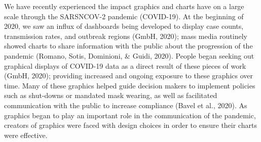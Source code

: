 \documentclass[print]{nuthesis}
\begin{document}
We have recently experienced the impact graphics and charts have on a large scale through the SARSNCOV-2 pandemic (COVID-19). At the beginning of 2020, we saw an influx of dashboards being developed to display case counts, transmission rates, and outbreak regions (GmbH, 2020); mass media routinely showed charts to share information with the public about the progression of the pandemic (Romano, Sotis, Dominioni, \& Guidi, 2020).
People began seeking out graphical displays of COVID-19 data as a direct result of these pieces of work (GmbH, 2020); providing increased and ongoing exposure to these graphics over time. 
Many of these graphics helped guide decision makers to implement policies such as shut-downs or mandated mask wearing, as well as facilitated communication with the public to increase compliance (Bavel et al., 2020).
As graphics began to play an important role in the communication of the pandemic, creators of graphics were faced with design choices in order to ensure their charts were effective.
\end{document}
